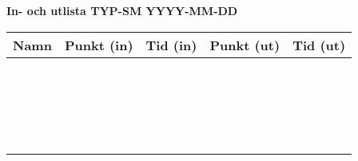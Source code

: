 \documentclass[notitlepage, oneside, 12pt]{article}
\begin{document}
\begin{center}
\noindent\huge\bf In- och utlista TYP-SM YYYY-MM-DD %
\end{center}
\addvspace{1cm}

\begin{center}
\begin{tabular}{@{}|p{}|p{}|p{}|p{}|p{}|@{}}
\hline
\bf Namn & \bf Punkt (in) & \bf Tid (in) & \bf Punkt (ut) & \bf Tid (ut) \\
\hline
\rule{0pt}{1cm} & & & & \\
\hline
\rule{0pt}{1cm} & & & & \\
\hline
\rule{0pt}{1cm} & & & & \\
\hline
\rule{0pt}{1cm} & & & &\\
\hline
\rule{0pt}{1cm} & & & &\\
\hline
\rule{0pt}{1cm} & & & &\\
\hline
\rule{0pt}{1cm} & & & &\\
\hline
\rule{0pt}{1cm} & & & &\\
\hline
\rule{0pt}{1cm} & & & &\\
\hline
\rule{0pt}{1cm} & & & &\\
\hline
\rule{0pt}{1cm} & & & &\\
\hline
\rule{0pt}{1cm} & & & &\\
\hline
\rule{0pt}{1cm} & & & &\\
\hline
\rule{0pt}{1cm} & & & &\\
\hline
\rule{0pt}{1cm} & & & &\\
\hline
\rule{0pt}{1cm} & & & &\\
\hline
\rule{0pt}{1cm} & & & &\\
\hline
\rule{0pt}{1cm} & & & &\\
\hline
\rule{0pt}{1cm} & & & &\\
\hline
\rule{0pt}{1cm} & & & &\\
\hline
\end{tabular}
\end{center}
\end{document}
